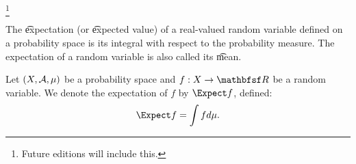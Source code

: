 
\footnote{Future editions will include this.}


The \t{expectation} (or \t{expected value}) of a real-valued random variable defined on a probability space is its integral with respect to the probability measure.
The expectation of a random variable is also called its \t{mean}.


Let $(X, \mathcal{A}, \mu)$ be a probability space and $f: X \to \R$ be a random variable.
We denote the expectation of $f$ by $\Expect f$, defined:
\[
  \Expect f = \int f d\mu.
\]

\blankpage
